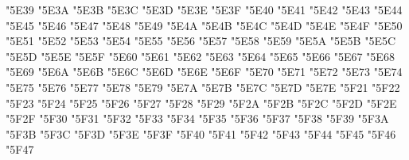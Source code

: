 {\Uchar\jis"5E39 %
\Uchar\jis"5E3A %
\Uchar\jis"5E3B %
\Uchar\jis"5E3C %
\Uchar\jis"5E3D %
\Uchar\jis"5E3E %
\Uchar\jis"5E3F %
\Uchar\jis"5E40 %
\Uchar\jis"5E41 %
\Uchar\jis"5E42 %
\Uchar\jis"5E43 %
\Uchar\jis"5E44 %
\Uchar\jis"5E45 %
\Uchar\jis"5E46 %
\Uchar\jis"5E47 %
\Uchar\jis"5E48 %
\Uchar\jis"5E49 %
\Uchar\jis"5E4A %
\Uchar\jis"5E4B %
\Uchar\jis"5E4C %
\Uchar\jis"5E4D %
\Uchar\jis"5E4E %
\Uchar\jis"5E4F %
\Uchar\jis"5E50 %
\Uchar\jis"5E51 %
\Uchar\jis"5E52 %
\Uchar\jis"5E53 %
\Uchar\jis"5E54 %
\Uchar\jis"5E55 %
\Uchar\jis"5E56 %
\Uchar\jis"5E57 %
\Uchar\jis"5E58 %
\Uchar\jis"5E59 %
\Uchar\jis"5E5A %
\Uchar\jis"5E5B %
\Uchar\jis"5E5C %
\Uchar\jis"5E5D %
\Uchar\jis"5E5E %
\Uchar\jis"5E5F %
\Uchar\jis"5E60 %
\Uchar\jis"5E61 %
\Uchar\jis"5E62 %
\Uchar\jis"5E63 %
\Uchar\jis"5E64 %
\Uchar\jis"5E65 %
\Uchar\jis"5E66 %
\Uchar\jis"5E67 %
\Uchar\jis"5E68 %
\Uchar\jis"5E69 %
\Uchar\jis"5E6A %
\Uchar\jis"5E6B %
\Uchar\jis"5E6C %
\Uchar\jis"5E6D %
\Uchar\jis"5E6E %
\Uchar\jis"5E6F %
\Uchar\jis"5E70 %
\Uchar\jis"5E71 %
\Uchar\jis"5E72 %
\Uchar\jis"5E73 %
\Uchar\jis"5E74 %
\Uchar\jis"5E75 %
\Uchar\jis"5E76 %
\Uchar\jis"5E77 %
\Uchar\jis"5E78 %
\Uchar\jis"5E79 %
\Uchar\jis"5E7A %
\Uchar\jis"5E7B %
\Uchar\jis"5E7C %
\Uchar\jis"5E7D %
\Uchar\jis"5E7E %
\Uchar\jis"5F21 %
\Uchar\jis"5F22 %
\Uchar\jis"5F23 %
\Uchar\jis"5F24 %
\Uchar\jis"5F25 %
\Uchar\jis"5F26 %
\Uchar\jis"5F27 %
\Uchar\jis"5F28 %
\Uchar\jis"5F29 %
\Uchar\jis"5F2A %
\Uchar\jis"5F2B %
\Uchar\jis"5F2C %
\Uchar\jis"5F2D %
\Uchar\jis"5F2E %
\Uchar\jis"5F2F %
\Uchar\jis"5F30 %
\Uchar\jis"5F31 %
\Uchar\jis"5F32 %
\Uchar\jis"5F33 %
\Uchar\jis"5F34 %
\Uchar\jis"5F35 %
\Uchar\jis"5F36 %
\Uchar\jis"5F37 %
\Uchar\jis"5F38 %
\Uchar\jis"5F39 %
\Uchar\jis"5F3A %
\Uchar\jis"5F3B %
\Uchar\jis"5F3C %
\Uchar\jis"5F3D %
\Uchar\jis"5F3E %
\Uchar\jis"5F3F %
\Uchar\jis"5F40 %
\Uchar\jis"5F41 %
\Uchar\jis"5F42 %
\Uchar\jis"5F43 %
\Uchar\jis"5F44 %
\Uchar\jis"5F45 %
\Uchar\jis"5F46 %
\Uchar\jis"5F47 %
}
